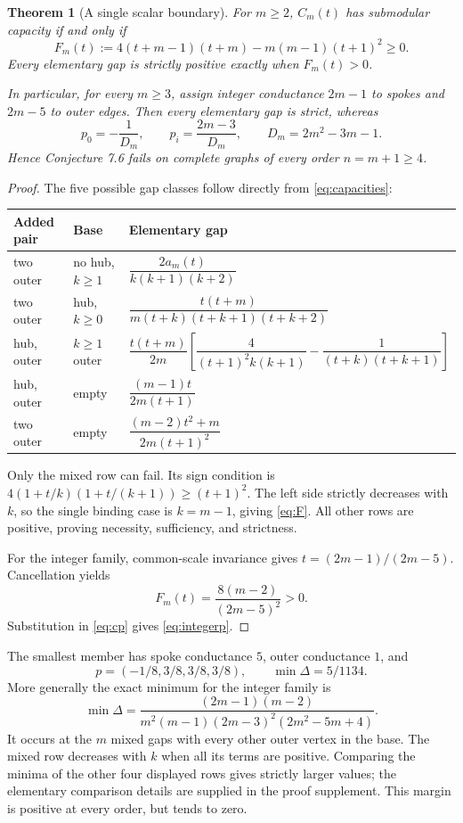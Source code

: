 \documentclass[11pt,a4paper]{article}
\newtheorem{theorem}{Theorem}
\newcommand{\Del}{\Delta}
\begin{document}
\begin{theorem}[A single scalar boundary]\label{thm:complete}
For $m\ge2$, $C_m(t)$ has submodular capacity if and only if
\begin{equation}\label{eq:F}
F_m(t):=4(t+m-1)(t+m)-m(m-1)(t+1)^2\ge0.
\end{equation}
Every elementary gap is strictly positive exactly when $F_m(t)>0$.

In particular, for every $m\ge3$, assign integer conductance $2m-1$ to spokes and $2m-5$ to outer edges. Then every elementary gap is strict, whereas
\begin{equation}\label{eq:integerp}
\boxed{\quad
p_0=-\frac1{D_m},\qquad
p_i=\frac{2m-3}{D_m},\qquad D_m=2m^2-3m-1.
\quad}
\end{equation}
Hence Conjecture 7.6 fails on complete graphs of every order $n=m+1\ge4$.
\end{theorem}
\begin{proof}
The five possible gap classes follow directly from \eqref{eq:capacities}:
\begin{center}\small
\begin{tabular}{lll}
\toprule
Added pair & Base & Elementary gap\\\midrule
two outer & no hub, $k\ge1$&
$\dfrac{2a_m(t)}{k(k+1)(k+2)}$\\[3mm]
two outer & hub, $k\ge0$&
$\dfrac{t(t+m)}{m(t+k)(t+k+1)(t+k+2)}$\\[3mm]
hub, outer & $k\ge1$ outer&
$\dfrac{t(t+m)}{2m}\left[\dfrac4{(t+1)^2k(k+1)}-\dfrac1{(t+k)(t+k+1)}\right]$\\[3mm]
hub, outer & empty&
$\dfrac{(m-1)t}{2m(t+1)}$\\[3mm]
two outer & empty&
$\dfrac{(m-2)t^2+m}{2m(t+1)^2}$\\
\bottomrule
\end{tabular}
\end{center}
Only the mixed row can fail. Its sign condition is
$4(1+t/k)(1+t/(k+1))\ge(t+1)^2$.
The left side strictly decreases with $k$, so the single binding case is $k=m-1$, giving \eqref{eq:F}. All other rows are positive, proving necessity, sufficiency, and strictness.

For the integer family, common-scale invariance gives $t=(2m-1)/(2m-5)$. Cancellation yields
\[
F_m(t)=\frac{8(m-2)}{(2m-5)^2}>0.
\]
Substitution in \eqref{eq:cp} gives \eqref{eq:integerp}.
\end{proof}

The smallest member has spoke conductance $5$, outer conductance $1$, and
\[
p=(-1/8,3/8,3/8,3/8),\qquad \min\Del=5/1134.
\]
More generally the exact minimum for the integer family is
\begin{equation}\label{eq:min}
\min\Del=
\frac{(2m-1)(m-2)}
{m^2(m-1)(2m-3)^2(2m^2-5m+4)}.
\end{equation}
It occurs at the $m$ mixed gaps with every other outer vertex in the base. The mixed row decreases with $k$ when all its terms are positive. Comparing the minima of the other four displayed rows gives strictly larger values; the elementary comparison details are supplied in the proof supplement. This margin is positive at every order, but tends to zero.
\end{document}
